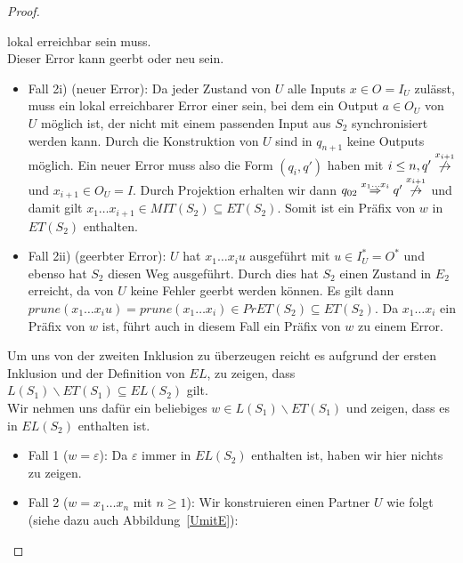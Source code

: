 \begin{proof}
\begin{itemize}
      lokal erreichbar sein muss.\\
      Dieser Error kann geerbt oder neu sein.\\
      \begin{itemize}
        \item Fall 2i) (neuer Error): Da jeder Zustand von $U$ alle Inputs $x\in
          O=I_U$ zulässt, muss ein lokal erreichbarer Error einer sein, bei dem
          ein Output $a\in O_U$ von $U$ möglich ist, der nicht mit einem
          passenden Input aus $S_2$ synchronisiert werden kann. Durch die
          Konstruktion von $U$ sind in $q_{n+1}$ keine Outputs möglich. Ein
          neuer Error muss also die Form $(q_i,q')$ haben mit $i\leq n, q'
          \overset{x_{i+1}}{\not{\hspace{-0.1cm}\rightarrow}}$ und $x_{i+1}\in
          O_U=I$. Durch Projektion erhalten wir dann $q_{02} \overset{x_1\dots
          x_i}{\Rightarrow} q'
          \overset{x_{i+1}}{\not{\hspace{-0.1cm}\rightarrow}}$ und damit gilt
          $x_1\dots x_{i+1}\in MIT(S_2)\subseteq ET(S_2)$. Somit ist ein Präfix
          von $w$ in $ET(S_2)$ enthalten.
        \item Fall 2ii) (geerbter Error): $U$ hat $x_1\dots x_i u$ ausgeführt
          mit $u\in I_U^*=O^*$ und ebenso hat $S_2$ diesen Weg ausgeführt.
          Durch dies hat $S_2$ einen Zustand in $E_2$ erreicht, da von $U$
          keine Fehler geerbt werden können. Es gilt dann $prune(x_1\dots
          x_iu)=prune(x_1\dots x_i)\in PrET(S_2)\subseteq ET(S_2)$. Da $x_1\dots
          x_i$ ein Präfix von $w$ ist, führt auch in diesem Fall ein Präfix von
          $w$ zu einem Error.
      \end{itemize}
  \end{itemize}
  Um uns von der zweiten Inklusion zu überzeugen reicht es aufgrund der ersten
  Inklusion und der Definition von $EL$, zu zeigen, dass
  $L(S_1)\backslash ET(S_1)\subseteq EL(S_2)$ gilt.\\
  Wir nehmen uns dafür ein beliebiges $w\in L(S_1)\backslash ET(S_1)$ und
  zeigen, dass es in $EL(S_2)$ enthalten ist.
  \begin{itemize}
    \item Fall 1 ($w=\varepsilon$): Da $\varepsilon$ immer in $EL(S_2)$
      enthalten ist, haben wir hier nichts zu zeigen.
    \item Fall 2 ($w=x_1\dots x_n$ mit $n\geq 1$): Wir konstruieren einen
      Partner $U$ wie folgt (siehe dazu auch Abbildung~\ref{UmitE}):

\end{itemize}
\end{proof}

